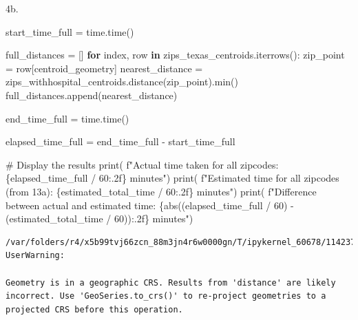 \documentclass[
  letterpaper,
  DIV=11,
  numbers=noendperiod]{scrartcl}
\newenvironment{Shaded}{\begin{snugshade}}{\end{snugshade}}
\newcommand{\BuiltInTok}[1]{\textcolor[rgb]{0.00,0.23,0.31}{#1}}
\newcommand{\CommentTok}[1]{\textcolor[rgb]{0.37,0.37,0.37}{#1}}
\newcommand{\ControlFlowTok}[1]{\textcolor[rgb]{0.00,0.23,0.31}{\textbf{#1}}}
\newcommand{\DecValTok}[1]{\textcolor[rgb]{0.68,0.00,0.00}{#1}}
\newcommand{\KeywordTok}[1]{\textcolor[rgb]{0.00,0.23,0.31}{\textbf{#1}}}
\newcommand{\NormalTok}[1]{\textcolor[rgb]{0.00,0.23,0.31}{#1}}
\newcommand{\OperatorTok}[1]{\textcolor[rgb]{0.37,0.37,0.37}{#1}}
\newcommand{\SpecialCharTok}[1]{\textcolor[rgb]{0.37,0.37,0.37}{#1}}
\newcommand{\SpecialStringTok}[1]{\textcolor[rgb]{0.13,0.47,0.30}{#1}}
\newcommand{\StringTok}[1]{\textcolor[rgb]{0.13,0.47,0.30}{#1}}
\begin{document}
4b.

\begin{Shaded}
\begin{Highlighting}[]
\NormalTok{start\_time\_full }\OperatorTok{=}\NormalTok{ time.time()}

\NormalTok{full\_distances }\OperatorTok{=}\NormalTok{ []}
\ControlFlowTok{for}\NormalTok{ index, row }\KeywordTok{in}\NormalTok{ zips\_texas\_centroids.iterrows():}
\NormalTok{    zip\_point }\OperatorTok{=}\NormalTok{ row[}\StringTok{\textquotesingle{}centroid\_geometry\textquotesingle{}}\NormalTok{]}
\NormalTok{    nearest\_distance }\OperatorTok{=}\NormalTok{ zips\_withhospital\_centroids.distance(zip\_point).}\BuiltInTok{min}\NormalTok{()}
\NormalTok{    full\_distances.append(nearest\_distance)}

\NormalTok{end\_time\_full }\OperatorTok{=}\NormalTok{ time.time()}

\NormalTok{elapsed\_time\_full }\OperatorTok{=}\NormalTok{ end\_time\_full }\OperatorTok{{-}}\NormalTok{ start\_time\_full}

\CommentTok{\# Display the results}
\BuiltInTok{print}\NormalTok{(}
    \SpecialStringTok{f"Actual time taken for all zipcodes: }\SpecialCharTok{\{}\NormalTok{elapsed\_time\_full }\OperatorTok{/} \DecValTok{60}\SpecialCharTok{:.2f\}}\SpecialStringTok{ minutes"}\NormalTok{)}
\BuiltInTok{print}\NormalTok{(}
    \SpecialStringTok{f"Estimated time for all zipcodes (from 13a): }\SpecialCharTok{\{}\NormalTok{estimated\_total\_time }\OperatorTok{/} \DecValTok{60}\SpecialCharTok{:.2f\}}\SpecialStringTok{ minutes"}\NormalTok{)}
\BuiltInTok{print}\NormalTok{(}
    \SpecialStringTok{f"Difference between actual and estimated time: }\SpecialCharTok{\{}\BuiltInTok{abs}\NormalTok{((elapsed\_time\_full }\OperatorTok{/} \DecValTok{60}\NormalTok{) }\OperatorTok{{-}}\NormalTok{ (estimated\_total\_time }\OperatorTok{/} \DecValTok{60}\NormalTok{))}\SpecialCharTok{:.2f\}}\SpecialStringTok{ minutes"}\NormalTok{)}
\end{Highlighting}
\end{Shaded}

\begin{verbatim}
/var/folders/r4/x5b99tvj66zcn_88m3jn4r6w0000gn/T/ipykernel_60678/1142370836.py:6: UserWarning:

Geometry is in a geographic CRS. Results from 'distance' are likely incorrect. Use 'GeoSeries.to_crs()' to re-project geometries to a projected CRS before this operation.

\end{verbatim}
\end{document}
